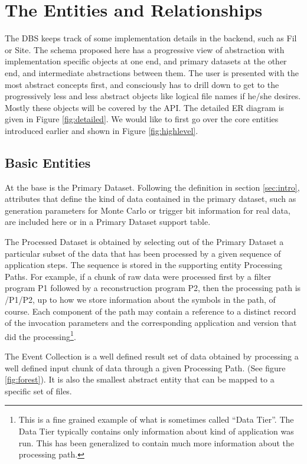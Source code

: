\documentclass{cmspaper}
\begin{document}
\section{The Entities and Relationships}
\label{sec:details}

The DBS keeps track of some implementation details in the backend, such as 
Fil or Site.
The schema proposed here has a progressive view of abstraction 
with implementation specific objects at one end, and primary datasets at the 
other end, and 
intermediate abstractions between them.  The user is presented with the most
abstract concepts first, and consciously has to drill 
down to get to the progressively less and less abstract objects like 
logical file names if he/she desires.  Mostly these objects will be covered by the
API.  The detailed ER diagram is given in Figure \ref{fig:detailed}. We 
would like to first go over the core entities introduced earlier and
shown in Figure \ref{fig:highlevel}.

\subsection{Basic Entities}

At the base is the Primary Dataset.  
Following the definition in section \ref{sec:intro},  
attributes that define the kind of data contained in the 
primary dataset, such as generation parameters for Monte Carlo or 
trigger bit information for real data, are included here or in a 
Primary Dataset support table.  

The Processed Dataset is obtained by 
selecting out of the Primary Dataset a particular subset of the data that has been 
processed by a given sequence of application steps.  The sequence is stored 
in the supporting entity Processing Paths.  For example,
if a chunk of raw data were processed first by a filter program P1 followed 
by a reconstruction program P2, then the processing path is /P1/P2, up to how we
store information about the symbols in the path, of course.  Each component 
of the path may contain a reference to a distinct record of the 
invocation parameters and the corresponding application and version that did 
the processing\footnote{This is a fine grained example of what is sometimes called
``Data Tier''.  The Data Tier typically contains only information about kind
of application was run.  This has been generalized to contain much more information 
about the processing path.}. 

The Event Collection is a well defined result set of data obtained by processing a 
well defined input chunk of data through a given Processing Path.  (See figure \ref{fig:forest}).
It is also the smallest abstract entity that can be mapped to a specific set of files.
\end{document}
